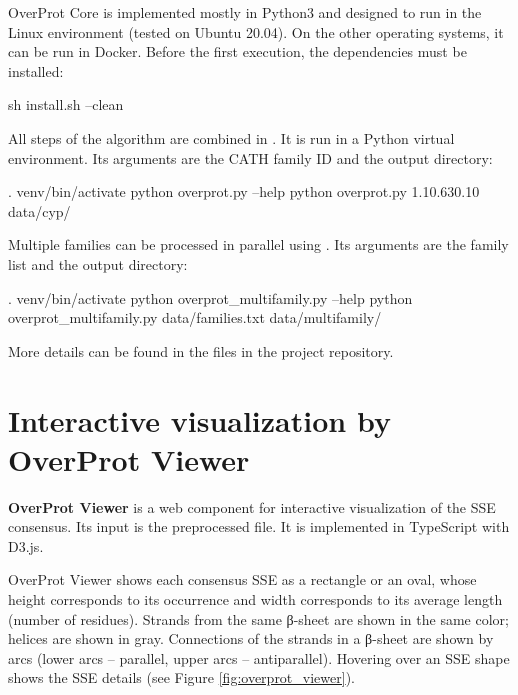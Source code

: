 \documentclass{article}
\begin{document}
OverProt Core is implemented mostly in Python3 
and designed to run in the Linux environment (tested on Ubuntu 20.04).
On the other operating systems, it can be run in Docker.
Before the first execution, the dependencies must be installed:

\begin{codeblock}
  sh install.sh --clean
\end{codeblock}

All steps of the algorithm are combined in . 
It is run in a Python virtual environment. 
Its arguments are the CATH family ID and the output directory:

\begin{codeblock}
  . venv/bin/activate
  python overprot.py --help
  python overprot.py 1.10.630.10 data/cyp/
\end{codeblock}

Multiple families can be processed in parallel using . 
Its arguments are the family list and the output directory:

\begin{codeblock}
  . venv/bin/activate
  python overprot_multifamily.py --help
  python overprot_multifamily.py data/families.txt data/multifamily/
\end{codeblock}

More details can be found in the  files 
in the project repository.



\section{Interactive visualization by OverProt Viewer}

\textbf{OverProt Viewer} is a web component for interactive
visualization of the SSE consensus. Its input is the preprocessed
 file. It is implemented in TypeScript with D3.js.

OverProt Viewer shows each consensus SSE as a rectangle or an oval, whose height 
corresponds to its occurrence 
and width corresponds to its average length (number of residues). 
Strands from the same β-sheet are shown in the same color; helices are shown in gray. 
Connections of the strands in a β-sheet are shown by arcs 
(lower arcs -- parallel, upper arcs -- antiparallel). 
Hovering over an SSE shape shows the SSE details (see Figure \ref{fig:overprot_viewer}).
\end{document}
